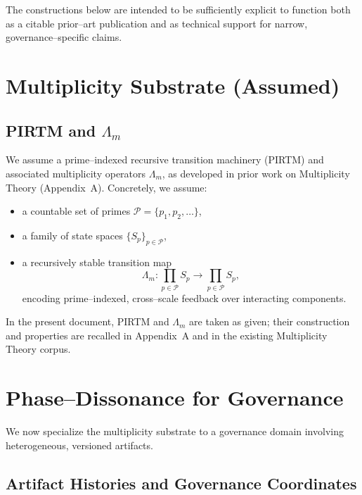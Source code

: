 \documentclass[11pt]{article}
\begin{document}
The constructions below are intended to be sufficiently explicit to function both as a citable prior--art publication and as technical support for narrow, governance--specific claims.
\newpage
\section{Multiplicity Substrate (Assumed)}

\subsection{PIRTM and $\Lambda_m$}

\begin{assumption}\label{ass:substrate}
We assume a prime--indexed recursive transition machinery (PIRTM) and associated multiplicity operators $\Lambda_m$, as developed in prior work on Multiplicity Theory (Appendix~A). Concretely, we assume:
\begin{itemize}
  \item a countable set of primes $\mathcal{P} = \{p_1,p_2,\dots\}$,
  \item a family of state spaces $\{S_p\}_{p \in \mathcal{P}}$,
  \item a recursively stable transition map
  \[
    \Lambda_m : \prod_{p \in \mathcal{P}} S_p \to \prod_{p \in \mathcal{P}} S_p,
  \]
  encoding prime--indexed, cross--scale feedback over interacting components.
\end{itemize}
\end{assumption}

In the present document, PIRTM and $\Lambda_m$ are taken as given; their construction and properties are recalled in Appendix~A and in the existing Multiplicity Theory corpus.

\section{Phase--Dissonance for Governance}

We now specialize the multiplicity substrate to a governance domain involving heterogeneous, versioned artifacts.

\subsection{Artifact Histories and Governance Coordinates}
\end{document}
